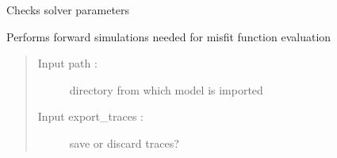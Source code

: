 \documentclass[letterpaper,10pt,english]{sphinxmanual}
\begin{document}
\begin{fulllineitems}
\begin{fulllineitems}
\label{\detokenize{ref/seisflows.solver:seisflows.solver.specfem3d.specfem3d.check_solver_parameter_files}}
Checks solver parameters

\end{fulllineitems}


\begin{fulllineitems}
\label{\detokenize{ref/seisflows.solver:seisflows.solver.specfem3d.specfem3d.data_filenames}}
\end{fulllineitems}


\begin{fulllineitems}
\label{\detokenize{ref/seisflows.solver:seisflows.solver.specfem3d.specfem3d.data_wildcard}}
\end{fulllineitems}


\begin{fulllineitems}
\label{\detokenize{ref/seisflows.solver:seisflows.solver.specfem3d.specfem3d.eval_func}}
Performs forward simulations needed for misfit function evaluation
\begin{quote}\begin{description}
\item[{Input path :}] \leavevmode
directory from which model is imported

\item[{Input export\_traces :}] \leavevmode
save or discard traces?

\end{description}\end{quote}

\end{fulllineitems}


\end{fulllineitems}
\end{document}
